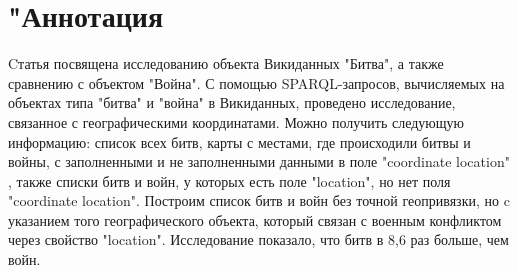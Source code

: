 \section{"Аннотация}

Cтатья посвящена исследованию объекта Викиданных "Битва", а также сравнению с объектом "Война". С помощью SPARQL-запросов, вычисляемых на объектах типа "битва" и "война" в Викиданных, проведено исследование, связанное с географическими координатами. Можно получить следующую информацию: список всех битв, карты с местами, где происходили битвы и войны, с заполненными и не заполненными данными в поле "coordinate location" , также списки битв и войн, у которых есть поле "location", но нет поля "coordinate location". Построим список битв и войн без точной геопривязки, но c указанием того географического объекта, который связан с военным конфликтом через свойство "location". Исследование показало, что битв в 8,6 раз больше, чем войн.